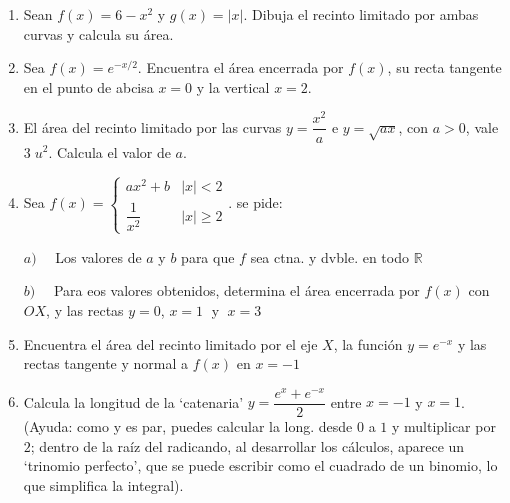 \begin{enumerate}


\item Sean $f(x)=6-x^2$ y $g(x)=|x|$. Dibuja el recinto limitado por ambas curvas y calcula su área.

\rightline{\textcolor{gris}{Sol: $44/3: u^2$}}


\item Sea $f(x)=e^{-x/2}$. Encuentra el área encerrada por $f(x)$, su recta tangente en el punto de abcisa $x=0$ y la vertical $x=2$.

\rightline{\textcolor{gris}{Sol: $(1-\frac 2 e)\; u^2$}}

\item El área del recinto limitado por las curvas $y=\dfrac {x^2}{a}$ e $y=\sqrt{ax}$, con $a>0$, vale $3\; u^2$. Calcula el valor de $a$.

\rightline{\textcolor{gris}{Sol: $a=3$}}


\item Sea $f(x)=\begin{cases} ax^2+b & |x|<2 \\ \dfrac 1 {x^2} & |x|\ge 2 \end{cases}$. se pide:

\vspace{3 mm}

\hspace{10mm} $a) \quad$ Los valores de $a $ y $b$ para que $f$ sea ctna. y dvble. en todo $\mathbb R$

\hspace{10mm} $b) \quad$ Para eos valores obtenidos, determina el área encerrada por $f(x)$ con $OX$, y las rectas $y=0$, $x=1\; $ y $\; x=3$



\item Encuentra el área del recinto limitado por el eje $X$, la función $y=e^{-x}$ y las rectas tangente y normal a $f(x)$ en $x=-1$


\item Calcula la longitud de la `catenaria' $y=\dfrac {e^x+e^{-x}}{2}$ entre $x=-1$ y $x=1$. (\scriptsize{Ayuda: como y es par, puedes calcular la long. desde $0$ a $1$ y multiplicar por $2$; dentro de la raíz del radicando, al desarrollar los cálculos, aparece un `trinomio perfecto', que se puede escribir como el cuadrado de un binomio, lo que simplifica la integral)}\normalsize{.}


\end{enumerate}
